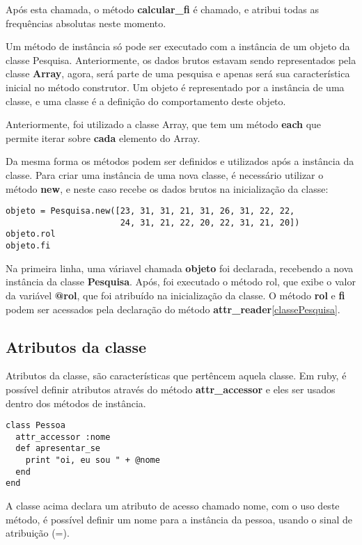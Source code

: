 \documentclass[espaco=simples,appendix=Name]{abnt}
\newcommand{\code}[1] {\textbf{#1}}
\begin{document}
Após esta chamada, o método \code{calcular\_fi} é chamado, e atribui todas as frequências absolutas neste momento. 

Um método de instância só pode ser executado com a instância de um objeto da classe Pesquisa. Anteriormente, os dados brutos estavam sendo representados pela classe \code{Array}, agora, será parte de uma pesquisa e apenas será sua característica inicial no método construtor. Um objeto é representado por a instância de uma classe, e uma classe é a definição do comportamento deste objeto.

Anteriormente, foi utilizado a classe Array, que tem um método \code{each} que permite iterar sobre \code{cada} elemento do Array. 

Da mesma forma os métodos podem ser definidos e utilizados após a instância da classe. Para criar uma instância de uma nova classe, é necessário utilizar o método \code{new}, e neste caso recebe os dados brutos na inicialização da classe:

\begin{lstlisting}[caption=Criando uma classe]
objeto = Pesquisa.new([23, 31, 31, 21, 31, 26, 31, 22, 22, 
                       24, 31, 21, 22, 20, 22, 31, 21, 20])
objeto.rol
objeto.fi
\end{lstlisting}

Na primeira linha, uma váriavel chamada \code{objeto} foi declarada, recebendo a nova instância da classe \code{Pesquisa}. Após, foi executado o método rol, que exibe o valor da variável \code{@rol}, que foi atribuído na inicialização da classe. O método \code{rol} e \code{fi} podem ser acessados pela declaração do método \code{attr\_reader}\ref{classePesquisa}. 

\subsection{ Atributos da classe }

Atributos da classe, são características que pertêncem aquela classe. Em ruby, é possível definir atributos através do método \code{attr\_accessor} e eles ser usados dentro dos métodos de instância.

\begin{lstlisting}[caption=Criando uma classe com atributos]
class Pessoa
  attr_accessor :nome
  def apresentar_se 
    print "oi, eu sou " + @nome
  end
end
\end{lstlisting}

A classe acima declara um atributo de acesso chamado nome, com o uso deste método, é possível definir um nome para a instância da pessoa, usando o sinal de atribuição (=).
\end{document}
